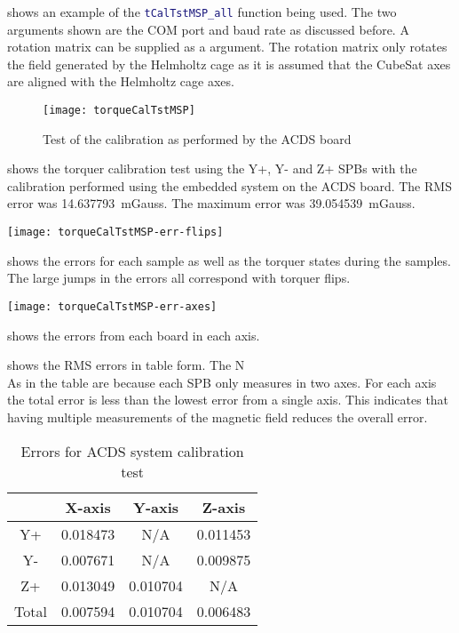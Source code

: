  shows an example of the \lstinline[style=code,language=Matlab]$tCalTstMSP_all$ function being used. The two arguments shown are the COM port and baud rate as discussed before. A rotation matrix can be supplied as a  argument. The rotation matrix only rotates the field generated by the Helmholtz cage as it is assumed that the CubeSat axes are aligned with the Helmholtz cage axes.

\begin{figure}[!ht]
    \centering
    \texttt{[image: torqueCalTstMSP]}
    \caption{Test of the calibration as performed by the \ac{ACDS} board}
    \label{fig:tcalMSP}
\end{figure}

 shows the torquer calibration test using the Y+, Y- and Z+ \acp{SPB} with the calibration performed using the embedded system on the \ac{ACDS} board. The RMS error was 14.637793~mGauss. The maximum error was 39.054539~mGauss.

\begin{sidewaysfigure}
    \centering
    \texttt{[image: torqueCalTstMSP-err-flips]}
    \caption{Error plot for \cref{fig:tcalMSP} showing torquer states}
    \label{fig:tcalMSPerr}
\end{sidewaysfigure}

 shows the errors for each sample as well as the torquer states during the samples. The large jumps in the errors all correspond with torquer flips.

\begin{sidewaysfigure}
    \centering
    \texttt{[image: torqueCalTstMSP-err-axes]}
    \caption{Plot of magnetic field errors for each axis}
    \label{fig:tcalMSPerr-axis}
\end{sidewaysfigure}

 shows the errors from each board in each axis.

 shows the RMS errors in table form. The N\\As in the table are because each \ac{SPB} only measures in two axes. For each axis the total error is less than the lowest error from a single axis. This indicates that having multiple measurements of the magnetic field reduces the overall error.

\begin{table}[!ht]
    \centering
    \caption{Errors for \ac{ACDS} system calibration test}
    \label{tab:tcalMSPerr}
    \begin{tabular}{|c|c|c|c|}
        \hline
        &X-axis&Y-axis&Z-axis\\
        \hline
        Y+&0.018473&N/A&0.011453\\
        \hline
        Y-&0.007671&N/A&0.009875\\
        \hline
        Z+&0.013049&0.010704&N/A\\
        \hline
        Total&0.007594&0.010704&0.006483\\
        \hline
    \end{tabular}
\end{table}

